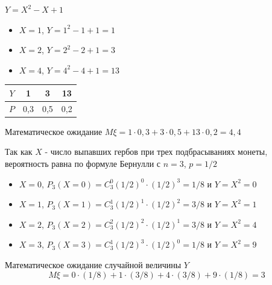 \begin{exercise}[6]
	$Y=X^2-X+1$
	\begin{itemize}
		\item $X=1$, $Y=1^2-1+1=1$
		\item $X=2$, $Y=2^2-2+1=3$
		\item $X=4$, $Y=4^2-4+1=13$
	\end{itemize}
	\begin{center}
		\begin{tabular}{|c|c|c|c|}
			\hline
			$Y$ & 1 & 3 & 13 \\ \hline
			$P$ & 0,3 & 0,5 & 0,2 \\ \hline
		\end{tabular}
	\end{center}
	Математическое ожидание $M\xi = 1 \cdot 0,3 + 3 \cdot 0,5 + 13 \cdot 0,2 = 4,4$
\end{exercise}

\begin{exercise}[7]
	Так как $X$ - число выпавших гербов при трех подбрасываниях монеты, вероятность равна по формуле Бернулли с $n=3$, $p=1/2$
	\begin{itemize}
		\item $X=0$, $P_3(X=0) = C^0_3 (1/2)^0 \cdot (1/2)^3=1/8$ и $Y=X^2=0$
		\item $X=1$, $P_3(X=1) = C^1_3 (1/2)^1 \cdot (1/2)^2 = 3/8$ и $Y=X^2=1$
		\item $X=2$, $P_3(X=2) = C^2_3 (1/2)^2 \cdot (1/2)^1 = 3/8$ и $Y=X^2=4$
		\item $X=3$, $P_3(X=3) = C^1_3 (1/2)^3 \cdot (1/2)^0 = 1/8$ и $Y=X^2=9$
	\end{itemize}
	Математическое ожидание случайной величины $Y$
	$$M\xi = 0 \cdot (1/8) + 1 \cdot (3/8) + 4 \cdot (3/8) + 9 \cdot (1/8) = 3$$
\end{exercise}

